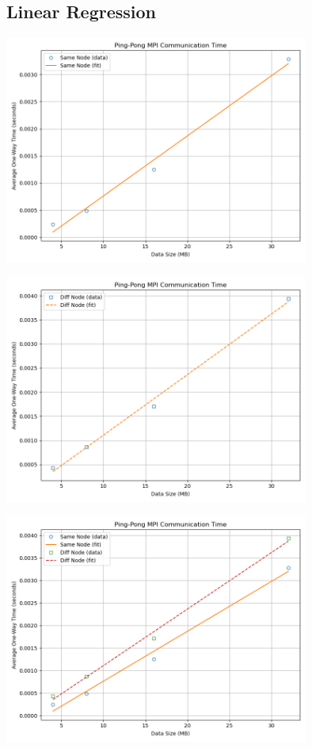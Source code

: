 \documentclass[11pt]{article}
\begin{document}
\subsection{Linear Regression}
\label{sec:org58f3f67}

\begin{center}
\includegraphics[width=10cm]{./img/pingpong_same_plot.png}
\end{center}

\begin{center}
\includegraphics[width=10cm]{./img/pingpong_diff_plot.png}
\end{center}

\begin{center}
\includegraphics[width=10cm]{./img/pingpong_communication_plot.png}
\end{center}
\end{document}
